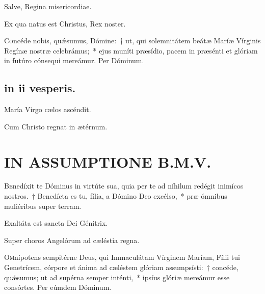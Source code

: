 \documentclass[vesperale_romanum.tex]{subfiles}
\begin{document}

\vv Salve, Regina misericordiae. \tpalleluia

\rr Ex qua natus est Christus, Rex noster. \tpalleluia


\lettrine{C}{o}ncéde nobis, quǽsumus, Dómine:~† ut, qui solemnitátem beátæ Maríæ Vírginis Regínæ nostræ celebrámus;~* ejus muníti præsídio, pacem in præsénti et glóriam in futúro cónsequi mereámur. Per Dóminum.

\subsection{in ii vesperis.}


\vv María Virgo cælos ascéndit. \tpalleluia

\rr Cum Christo regnat in ætérnum. \tpalleluia



\section{IN ASSUMPTIONE B.M.V.}



\lettrine{B}{e}nedíxit te Dóminus in virtúte sua, quia per te ad níhilum redégit inimícos nostros.~† Benedícta es tu, fília, a Dómino Deo excélso,~* præ ómnibus muliéribus super terram.



\vv Exaltáta est sancta Dei Génitrix.

\rr Super choros Angelórum ad cæléstia regna.


\lettrine{O}{m}nípotens sempitérne Deus, qui Immaculátam Vírginem Maríam, Fílii tui Genetrícem, córpore et ánima ad cæléstem glóriam assumpsísti:~† concéde, quǽsumus; ut ad supérna semper inténti,~* ipsíus glóriæ mereámur esse consórtes. Per eúmdem Dóminum.
 
\end{document}
